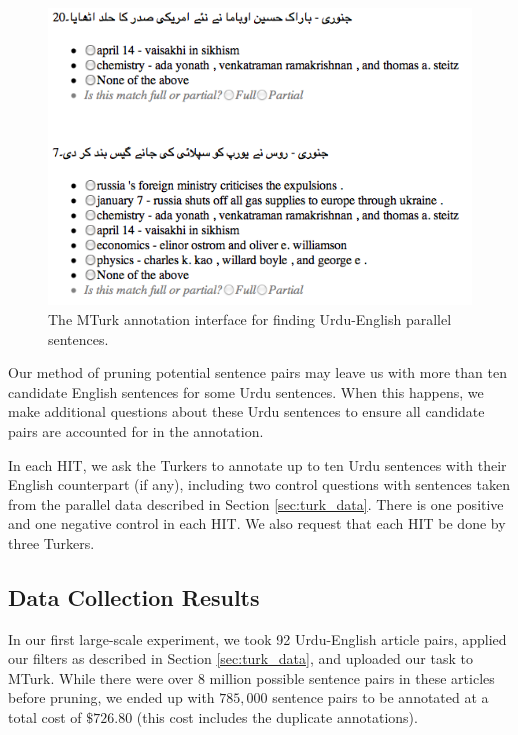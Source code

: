 \documentclass[11pt,letterpaper]{article}
\begin{document}
\begin{figure}[ht]
\begin{center}
\includegraphics[scale=0.5]{images/turk_hit.png}
\caption{The MTurk annotation interface for finding Urdu-English parallel sentences.}
\label{fig:alignment_hit}
\end{center}
\end{figure}

Our method of pruning potential sentence pairs may leave us with more than ten
candidate English sentences for some Urdu sentences. When this happens, we make
additional questions about these Urdu sentences to ensure all candidate pairs
are accounted for in the annotation. 

In each HIT, we ask the Turkers to annotate up to ten Urdu sentences with their
English counterpart (if any), including two control questions with sentences
taken from the parallel data described in Section \ref{sec:turk_data}. There is
one positive and one negative control in each HIT. We also request that each HIT
be done by three Turkers.

\subsection{Data Collection Results}
\label{sec:turk_results}
In our first large-scale experiment, we took 92 Urdu-English article
pairs, applied our filters as described in Section \ref{sec:turk_data}, and
uploaded our task to MTurk. While there were over 8 million possible sentence
pairs in these articles before pruning, we ended up with $785,000$ sentence
pairs to be annotated at a total cost of $\$726.80$ (this cost includes the duplicate
annotations).
\end{document}
